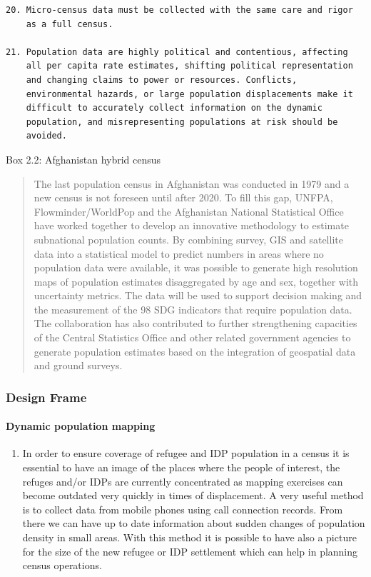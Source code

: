 \documentclass[
]{article}
\providecommand{\tightlist}{%
  \setlength{\itemsep}{0pt}\setlength{\parskip}{0pt}}
\begin{document}
\begin{verbatim}
20. Micro-census data must be collected with the same care and rigor
    as a full census.

21. Population data are highly political and contentious, affecting
    all per capita rate estimates, shifting political representation
    and changing claims to power or resources. Conflicts,
    environmental hazards, or large population displacements make it
    difficult to accurately collect information on the dynamic
    population, and misrepresenting populations at risk should be
    avoided.
\end{verbatim}

Box 2.2: Afghanistan hybrid census

\begin{quote}
The last population census in Afghanistan was conducted in 1979 and a new census is not foreseen until after 2020.
To fill this gap, UNFPA, Flowminder/WorldPop and the Afghanistan National Statistical Office have worked together to develop an innovative methodology to estimate subnational population counts.
By combining survey, GIS and satellite data into a statistical model to predict numbers in areas where no population data were available, it was possible to generate high resolution maps of population estimates disaggregated by age and sex, together with uncertainty metrics. The data will be used to support decision making and the measurement of the 98 SDG indicators that require population data. The collaboration has also contributed to further strengthening capacities of the Central Statistics Office and other related government agencies to generate population estimates based on the integration of geospatial data and ground surveys.
\end{quote}

\hypertarget{design-frame}{%
\subsubsection{Design Frame}\label{design-frame}}

\hypertarget{a.-dynamic-population-mapping}{%
\paragraph{Dynamic population mapping}\label{a.-dynamic-population-mapping}}

\begin{enumerate}
\def\labelenumi{\arabic{enumi}.}
\setcounter{enumi}{106}
\tightlist
\item
  In order to ensure coverage of refugee and IDP population in a
  census it is essential to have an image of the places where the
  people of interest, the refuges and/or IDPs are currently
  concentrated as mapping exercises can become outdated very quickly
  in times of displacement. A very useful method is to collect data
  from mobile phones using call connection records. From there we can
  have up to date information about sudden changes of population
  density in small areas. With this method it is possible to have also
  a picture for the size of the new refugee or IDP settlement which
  can help in planning census operations.
\end{enumerate}
\end{document}
